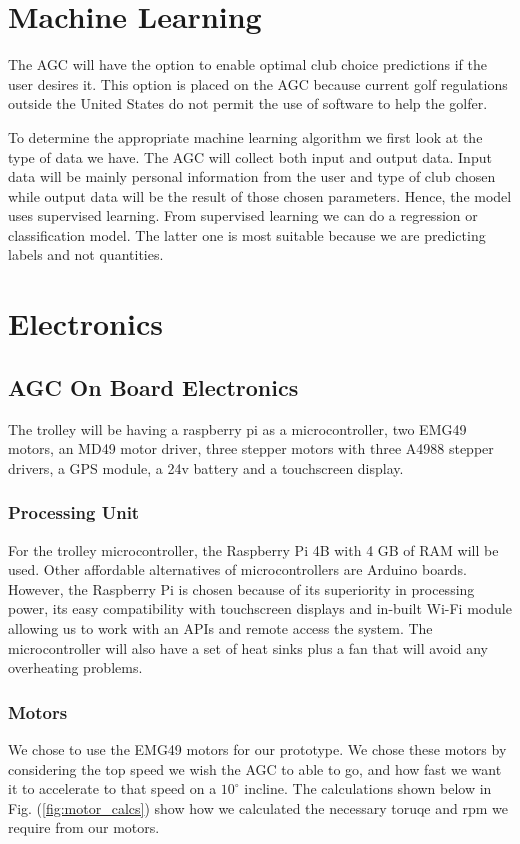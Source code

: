 \documentclass[11pt,landscape]{article}
\begin{document}
\begin{multicols}{3}
\section{Machine Learning}
The AGC will have the option to enable optimal club choice predictions if the
user desires it. This option is placed on the AGC because current golf
regulations outside the United States do not permit the use of software to help
the golfer.

To determine the appropriate machine learning algorithm we first look at the
type of data we have. The AGC will collect both input and output data. Input
data will be mainly personal information from the user and type of club chosen
while output data will be the result of those chosen parameters. Hence, the
model uses supervised learning. From supervised learning we can do a regression
or classification model. The latter one is most suitable because we are
predicting labels and not quantities.


\section{Electronics}
\label{electronics}
\subsection{AGC On Board Electronics}
The trolley will be having a raspberry pi as a microcontroller, two EMG49
motors, an MD49 motor driver, three stepper motors with three A4988 stepper
drivers, a GPS module, a 24v battery and a touchscreen display.

\subsubsection{Processing Unit}
For the trolley microcontroller, the Raspberry Pi 4B with 4 GB of RAM will be
used. Other affordable alternatives of microcontrollers are Arduino boards.
However, the Raspberry Pi is chosen because of its superiority in processing
power, its easy compatibility with touchscreen displays and in-built Wi-Fi
module allowing us to work with an APIs and remote access the system. The
microcontroller will also have a set of heat sinks plus a fan that will avoid
any overheating problems.


\subsubsection{Motors}
We chose to use the EMG49 motors for our prototype. We chose these motors by
considering the top speed we wish the AGC to able to go, and how fast we want it
to accelerate to that speed on a $10^\circ$ incline. The calculations shown
below in Fig. (\ref{fig:motor_calcs}) show how we calculated the necessary
toruqe and rpm we require from our motors.


\end{multicols}
\end{document}
